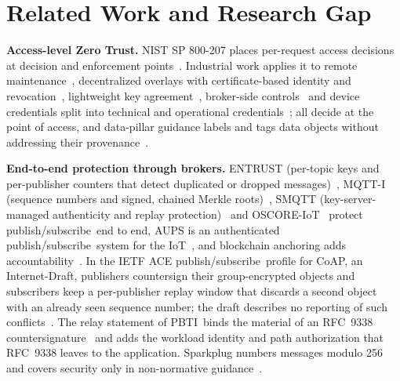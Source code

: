 \documentclass[futureinternet,article,submit,moreauthors]{Definitions/mdpi}
\newcommand{\sys}{PBTI}
\newcommand{\pubsub}{publish/\allowbreak{}subscribe}
\begin{document}
\section{Related Work and Research Gap}\label{sec:related}

\textbf{Access-level Zero Trust.} NIST SP 800-207 places per-request access decisions at decision and enforcement points~\cite{nist_sp800_207}. Industrial work applies it to remote maintenance~\cite{federici2023zt}, decentralized overlays with certificate-based identity and revocation~\cite{zanasi2024flexzt}, lightweight key agreement~\cite{zhang2026lztaka}, broker-side controls~\cite{james2025mqttzt} and device credentials split into technical and operational credentials~\cite{lazzaro2026vciot}; all decide at the point of access, and data-pillar guidance labels and tags data objects without addressing their provenance~\cite{nsa2024datapillar}.

\textbf{End-to-end protection through brokers.} ENTRUST (per-topic keys and per-publisher counters that detect duplicated or dropped messages)~\cite{dahlmanns2021entrust}, MQTT-I (sequence numbers and signed, chained Merkle roots)~\cite{buccafurri2024mqtti}, SMQTT (key-server-managed authenticity and replay protection)~\cite{yousaf2026smqtt} and OSCORE-IoT~\cite{dighriri2026oscoreiot} protect \pubsub\ end to end, AUPS is an authenticated \pubsub\ system for the IoT~\cite{rizzardi2016aups}, and blockchain anchoring adds accountability~\cite{lazzaro2024mqtt}. In the IETF ACE \pubsub\ profile for CoAP, an Internet-Draft, publishers countersign their group-encrypted objects and subscribers keep a per-publisher replay window that discards a second object with an already seen sequence number; the draft describes no reporting of such conflicts~\cite{ietf_ace_coap_pubsub}. The relay statement of \sys\ binds the material of an RFC~9338 countersignature~\cite{rfc9338} and adds the workload identity and path authorization that RFC~9338 leaves to the application. Sparkplug numbers messages modulo 256 and covers security only in non-normative guidance~\cite{sparkplug3}.
\end{document}
